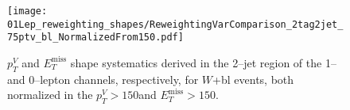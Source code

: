 \begin{figure}[ht!]
  \centering
  \texttt{[image: 01Lep\_reweighting\_shapes/ReweightingVarComparison\_2tag2jet\_75ptv\_bl\_NormalizedFrom150.pdf]}
  \caption{$p_T^V$ and $E_T^{\text{miss}}$ shape systematics derived in the
    2--jet region of the 1-- and 0--lepton channels, respectively, for $W$+bl
    events, both normalized in the $p_T^V > 150$\GeV and $E_T^{\text{miss}} >
    150$\GeV.}
  \label{fig:wjets_01lep_2jet_bl_SysWPtVBDTr_From150}
\end{figure}